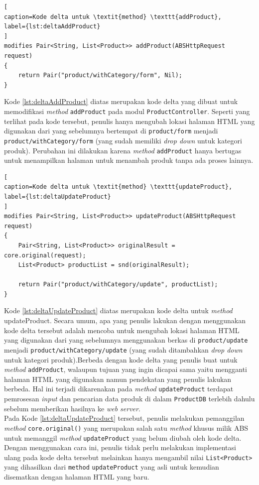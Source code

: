 \begin{lstlisting}[
caption=Kode delta untuk \textit{method} \texttt{addProduct},
label={lst:deltaAddProduct}
]
modifies Pair<String, List<Product>> addProduct(ABSHttpRequest request)
{	
   	return Pair("product/withCategory/form", Nil);
}
\end{lstlisting}

Kode \ref{lst:deltaAddProduct} diatas merupakan kode delta yang dibuat untuk memodifikasi \textit{method} \texttt{addProduct} pada modul \texttt{ProductController}. Seperti yang terlihat pada kode tersebut, penulis hanya mengubah lokasi halaman HTML yang digunakan dari yang sebelumnya bertempat di \texttt{product/form} menjadi \texttt{product/withCategory/form} (yang sudah memiliki \textit{drop down} untuk kategori produk). Perubahan ini dilakukan karena \textit{method} \texttt{addProduct} hanya bertugas untuk menampilkan halaman untuk menambah produk tanpa ada proses lainnya.

\begin{lstlisting}[
caption=Kode delta untuk \textit{method} \texttt{updateProduct},
label={lst:deltaUpdateProduct}
]
modifies Pair<String, List<Product>> updateProduct(ABSHttpRequest request)
{
	Pair<String, List<Product>> originalResult = core.original(request);
	List<Product> productList = snd(originalResult);
	
	return Pair("product/withCategory/update", productList);
}
\end{lstlisting}

Kode \ref{lst:deltaUpdateProduct} diatas merupakan kode delta untuk \textit{method} updateProduct. Secara umum, apa yang penulis lakukan dengan menggunakan kode delta tersebut adalah mencoba untuk mengubah lokasi halaman HTML yang digunakan dari yang sebelumnya menggunakan berkas di \texttt{product/update} menjadi \texttt{product/withCategory/update} (yang sudah ditambahkan \textit{drop down} untuk kategori produk).Berbeda dengan kode delta yang penulis buat untuk \textit{method} \texttt{addProduct}, walaupun tujuan yang ingin dicapai sama yaitu mengganti halaman HTML yang digunakan namun pendekatan yang penulis lakukan berbeda. Hal ini terjadi dikarenakan pada \textit{method} \texttt{updateProduct} terdapat pemrosesan \textit{input} dan pencarian data produk di dalam \texttt{ProductDB} terlebih dahulu sebelum memberikan hasilnya ke \textit{web server}.\\

Pada Kode \ref{lst:deltaUpdateProduct} tersebut, penulis melakukan pemanggilan \textit{method} \texttt{core.original()} yang merupakan salah satu \textit{method} khusus milik ABS untuk memanggil \textit{method} \texttt{updateProduct} yang belum diubah oleh kode delta. Dengan menggunakan cara ini, penulis tidak perlu melakukan implementasi ulang pada kode delta tersebut melainkan hanya mengambil nilai \texttt{List<Product>} yang dihasilkan dari \texttt{method} \texttt{updateProduct} yang asli untuk kemudian disematkan dengan halaman HTML yang baru.

